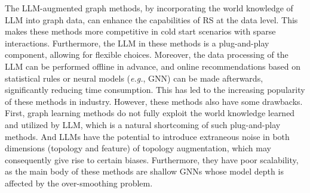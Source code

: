 The LLM-augmented graph methods, by incorporating the world knowledge of LLM into graph data, can enhance the capabilities of RS at the data level. This makes these methods more competitive in cold start scenarios with sparse interactions. Furthermore, the LLM in these methods is a plug-and-play component, allowing for flexible choices. Moreover, the data processing of the LLM can be performed offline in advance, and online recommendations based on statistical rules or neural models (\textit{e.g.}, GNN) can be made afterwards, significantly reducing time consumption. This has led to the increasing popularity of these methods in industry. However, these methods also have some drawbacks. First, graph learning methods do not fully exploit the world knowledge learned and utilized by LLM, which is a natural shortcoming of such plug-and-play methods. And LLMs have the potential to introduce extraneous noise in both dimensions (topology and feature) of topology augmentation, which may consequently give rise to certain biases. Furthermore, they have poor scalability, as the main body of these methods are shallow GNNs whose model depth is affected by the over-smoothing problem.
